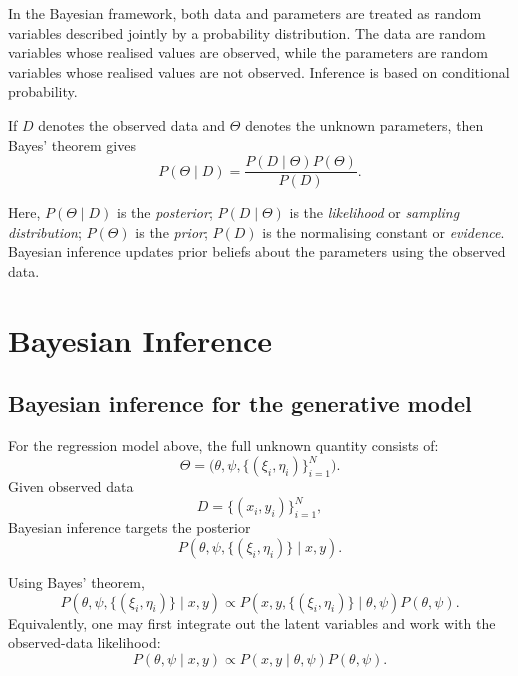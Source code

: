 \documentclass[11pt, titlepage]{article} %
\numberwithin{equation}{section}
\theoremstyle{definition}
\numberwithin{assumption}{section}
\begin{document}
In the Bayesian framework, both data and parameters are treated as random variables described jointly by a probability distribution. The data are random variables whose realised values are observed, while the parameters are random variables whose realised values are not observed. Inference is based on conditional probability.

If $D$ denotes the observed data and $\Theta$ denotes the unknown parameters, then Bayes' theorem gives
\begin{equation*}
     P(\Theta\mid D)
    =
    \frac{P(D\mid \Theta)P(\Theta)}{P(D)}.
\end{equation*}


Here, $P(\Theta\mid D)$ is the \textit{posterior}; $P(D\mid \Theta)$ is the \textit{likelihood} or \textit{sampling distribution}; $P(\Theta)$ is the \textit{prior}; $P(D)$ is the normalising constant or \textit{evidence}. Bayesian inference updates prior beliefs about the parameters using the observed data.





\section{Bayesian Inference}


\subsection{Bayesian inference for the generative model}

For the regression model above, the full unknown quantity consists of:
\begin{equation*}
    \Theta=\bigl(\theta,\psi,\{(\xi_i,\eta_i)\}_{i=1}^N\bigr).
\end{equation*}
Given observed data
\begin{equation*}
    D=\{(x_i,y_i)\}_{i=1}^N,
\end{equation*}
Bayesian inference targets the posterior
\begin{equation*}
    P\!\left(\theta,\psi,\{(\xi_i,\eta_i)\}\mid x,y\right).
\end{equation*}

Using Bayes' theorem,
\begin{equation*}
    P\!\left(\theta,\psi,\{(\xi_i,\eta_i)\}\mid x,y\right)
    \propto
    P\!\left(x,y,\{(\xi_i,\eta_i)\}\mid \theta,\psi\right)
    P(\theta,\psi).
\end{equation*}
Equivalently, one may first integrate out the latent variables and work with the observed-data likelihood:
\begin{equation*}
    P(\theta,\psi\mid x,y)
    \propto
    P(x,y\mid \theta,\psi)P(\theta,\psi).
\end{equation*}
\end{document}
